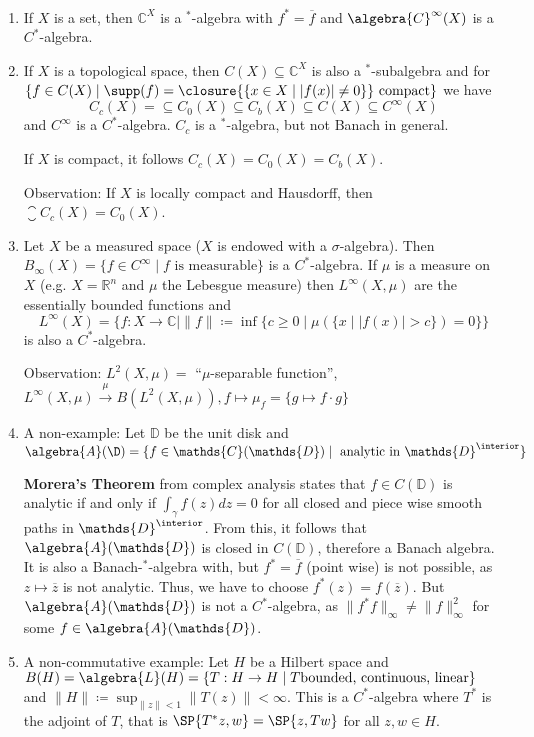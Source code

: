 \documentclass[a4paper]{article}
\begin{document}
\begin{example}~
	\begin{enumerate}
		\item If $X$ is a set, then $\mathds{C}^X$ is a $^*$-algebra with $f^* = \overline{f}$ and $\algebra{C}^\infty(X)$ is a $C^*$-algebra.
		\item If $X$ is a topological space, then $C(X) \subseteq \mathds{C}^X$ is also a $^*$-subalgebra and for $\{f \in C(X) \mid \supp(f) = \closure{\{x \in X \mid |f(x)| \neq 0\}} \text{ compact} \}$ we have
		      \begin{equation*}
			      C_c(X) = \subseteq C_0(X) \subseteq C_b(X) \subseteq C(X) \subseteq C^\infty(X)
		      \end{equation*}
		      and $C^\infty$ is a $C^*$-algebra. $C_c$ is a $^*$-algebra, but not Banach in general.

		      If $X$ is compact, it follows $C_c(X) = C_0(X) = C_b(X)$.

		      Observation: If $X$ is locally compact and Hausdorff, then $\closure{C_c(X)} = C_0(X)$.
		\item Let $X$ be a measured space ($X$ is endowed with a $\sigma$-algebra). Then $B_\infty(X) = \{f \in C^\infty \mid f \text{ is measurable}\}$ is a $C^*$-algebra.
		      If $\mu$ is a measure on $X$ (e.g. $X = \mathds{R}^n$ and $\mu$ the Lebesgue measure) then $L^\infty(X,\mu)$ are the essentially bounded functions and
		      \begin{equation*}
			      L^\infty(X) = \{f: X \to \mathds{C} \mid \|f\| \coloneqq \inf \{ c \geq 0 \mid \mu(\{x \mid |f(x)| > c\}) = 0 \} \}
		      \end{equation*}
		      is also a $C^*$-algebra.

		      Observation: $L^2(X, \mu) = $ \enquote{$\mu$-separable function}, $L^\infty(X, \mu) \xrightarrow{\mu} B(L^2(X,\mu)), f \mapsto \mu_f = \{g \mapsto f \cdot g\}$
		\item A non-example: Let $\mathds{D}$ be the unit disk and $\algebra{A}(\D) = \{f \in \mathds{C}(\mathds{D}) \mid \text{ analytic in } \mathds{D}^\interior \}$

		      \textbf{Morera's Theorem} from complex analysis states that $f \in C(\mathds{D})$ is analytic if and only if $\int_{\gamma} f(z) dz = 0$ for all closed and piece wise smooth paths in $\mathds{D}^\interior$. From this, it follows that $\algebra{A}(\mathds{D})$ is closed in $C(\mathds{D})$, therefore a Banach algebra. It is also a Banach-$^*$-algebra with, but $f^* = \overline{f}$ (point wise) is not possible, as $z \mapsto \overline{z}$ is not analytic. Thus, we have to choose $f^*(z) = f(\overline{z})$.
		      But $\algebra{A}(\mathds{D})$ is not a $C^*$-algebra, as $\| f^* f\|_\infty \neq \|f\|_\infty^2$ for some $f \in \algebra{A}(\mathds{D})$.
		\item A non-commutative example: Let $H$ be a Hilbert space and $B(H) = \algebra{L}(H) = \{T: H \to H \mid T \text{bounded, continuous, linear}\}$ and $\|H\| \coloneqq \sup_{\|z\| < 1} \|T(z)\| < \infty$. This is a $C^*$-algebra where $T^*$ is the adjoint of $T$, that is $\SP{T^* z, w} = \SP{z, Tw}$ for all $z,w \in H$.


\end{enumerate}
\end{example}
\end{document}
